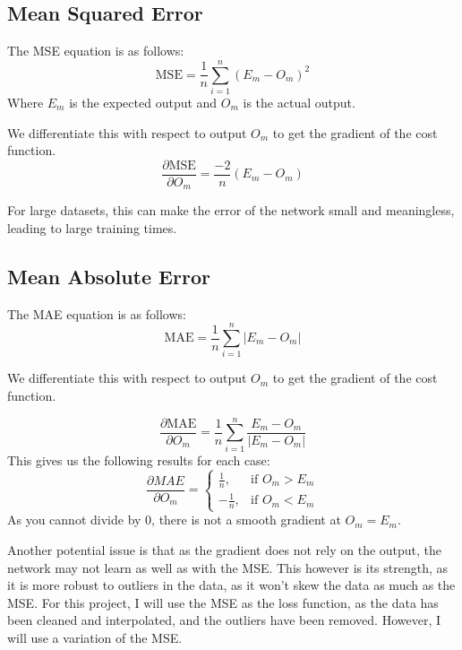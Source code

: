 \documentclass{report}
\begin{document}
\subsection{Mean Squared Error}
The MSE equation is as follows:
\begin{equation}
    \text{MSE} = \frac{1}{n}\sum_{i=1}^{n}(E_m - O_m)^2
\end{equation}
Where $E_m$ is the expected output and $O_m$ is the actual output.

We differentiate this with respect to output $O_m$ to get the gradient of the cost function.
\begin{equation}
    \frac{\partial \text{MSE}}{\partial O_m} = \frac{-2}{n}(E_m - O_m)
\end{equation}

For large datasets, this can make the error of the network small and meaningless, leading to large training times.

\subsection{Mean Absolute Error}
The MAE equation is as follows:
\begin{equation}
    \text{MAE} = \frac{1}{n}\sum_{i=1}^{n}|E_m - O_m|
\end{equation}

We differentiate this with respect to output $O_m$ to get the gradient of the cost function.

\begin{equation}
    \frac{\partial \text{MAE}}{\partial O_m} = \frac{1}{n}\sum_{i=1}^{n}\frac{E_m - O_m}{|E_m - O_m|}
\end{equation}
This gives us the following results for each case:
\begin{equation}
\frac{\partial MAE}{\partial O_m} =
\begin{cases} 
\frac{1}{n}, & \text{if } O_m > E_m \\ 
-\frac{1}{n}, & \text{if } O_m < E_m 
\end{cases}
\end{equation}
As you cannot divide by 0, there is not a smooth gradient at $O_m = E_m$.

Another potential issue is that as the gradient does not rely on the output, the network may not learn as well as with the MSE.
This however is its strength, as it is more robust to outliers in the data, as it won't skew the data as much as the MSE.
\vspace{1em}
\newline
For this project, I will use the MSE as the loss function, as the data has been cleaned and interpolated, and the outliers have been removed.
However, I will use a variation of the MSE.
\end{document}
